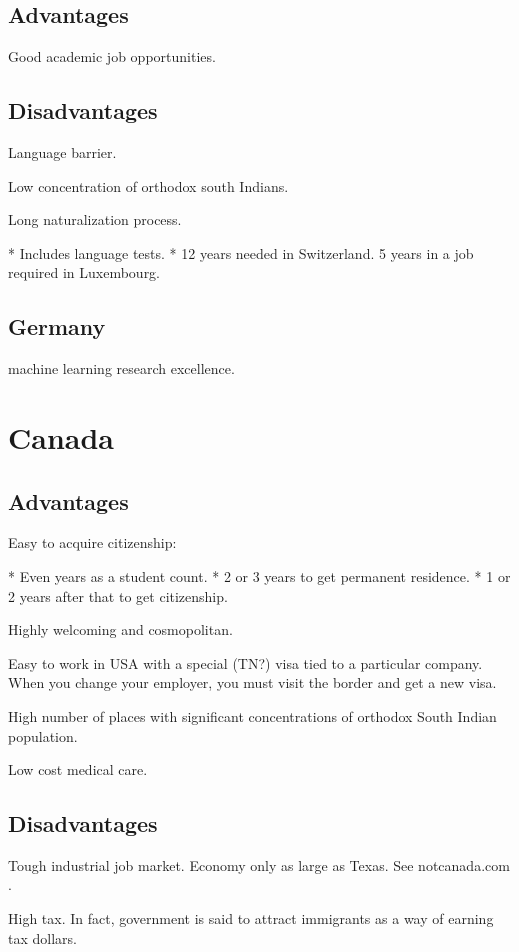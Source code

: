 \documentclass[oneside, article]{memoir}
\begin{document}
\subsection{Advantages}

Good academic job opportunities.
\subsection{Disadvantages}

Language barrier.

Low concentration of orthodox south Indians.

Long naturalization process.

    * Includes language tests.
    * 12 years needed in Switzerland. 5 years in a job required in Luxembourg.

\subsection{Germany}
machine learning research excellence.

\section{Canada}
\subsection{Advantages}

Easy to acquire citizenship:

    * Even years as a student count.
    * 2 or 3 years to get permanent residence.
    * 1 or 2 years after that to get citizenship.

Highly welcoming and cosmopolitan.

Easy to work in USA with a special (TN?) visa tied to a particular company. When you change your employer, you must visit the border and get a new visa.

High number of places with significant concentrations of orthodox South Indian population.

Low cost medical care.
\subsection{Disadvantages}

Tough industrial job market. Economy only as large as Texas. See notcanada.com .

High tax. In fact, government is said to attract immigrants as a way of earning tax dollars.
\end{document}
